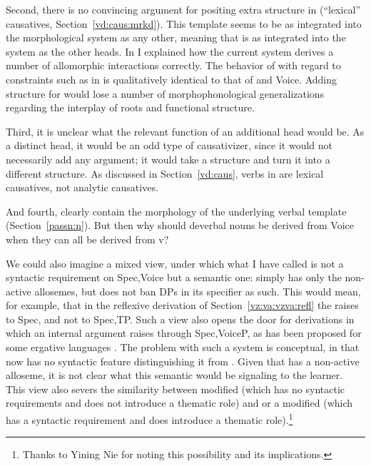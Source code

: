 \begin{exe}
\begin{xlist}
\begin{exe}
\begin{exe}
\begin{xlist}
\begin{exe}
\begin{exe}
\begin{exe}
\begin{exe}
\begin{exe}
\begin{xlist}
\begin{exe}
Second, there is no convincing argument for positing extra structure in {\thif} (``lexical'' causatives, Section~\ref{vd:caus:mrkd}). This template seems to be as integrated into the morphological system as any other, meaning that {\vd} is as integrated into the system as the other heads. In \cite{kastner18nllt} I explained how the current system derives a number of allomorphic interactions correctly. The behavior of {\vd} with regard to constraints such as  in  is qualitatively identical to that of {\vz} and Voice. Adding structure for {\thif} would lose a number of morphophonological generalizations regarding the interplay of roots and functional structure.

Third, it is unclear what the relevant function of an additional head would be. As a  distinct  head, it would be an odd type of causativizer, since it would not necessarily add any argument; it would take a  structure and turn it into a different  structure. As discussed in Section~\ref{vd:caus},  verbs in {\thif} are lexical causatives, not analytic causatives.

And fourth,  clearly contain the morphology of the underlying verbal template (Section~\ref{passn:n}). But then why should deverbal nouns be derived from Voice when they can all be derived from v?

We could also imagine a mixed view, under which what I have called {\vz} is not a syntactic requirement on Spec,Voice but a semantic one: {\vz} simply has only the non-active allosemes, but does not ban DPs in its specifier as such. This would mean, for example, that in the reflexive derivation of Section~\ref{vz:va:vzva:refl} the  raises to Spec,{\vz} and not to Spec,TP. Such a view also opens the door for derivations in which an internal argument raises through Spec,VoiceP, as has been proposed for some ergative languages \citep{deal19li}. The problem with such a system is conceptual, in that {\vz} now has no syntactic feature distinguishing it from . Given that  has a non-active alloseme, it is not clear what this semantic {\vz} would be signaling to the learner. This view also severs the similarity between modified {\vz} (which has no syntactic requirements and does not introduce a thematic role) and {\pz} or a modified {\pz} (which has a syntactic requirement and does introduce a thematic role).\footnote{Thanks to Yining Nie for noting this possibility and its implications.}


\end{exe}
\end{xlist}
\end{exe}
\end{exe}
\end{exe}
\end{exe}
\end{exe}
\end{xlist}
\end{exe}
\end{exe}
\end{xlist}
\end{exe}
